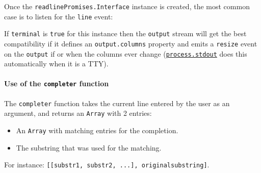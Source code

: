 Once the \texttt{readlinePromises.Interface} instance is created, the
most common case is to listen for the
\texttt{\textquotesingle{}line\textquotesingle{}} event:

\begin{Shaded}
\begin{Highlighting}[]
\NormalTok{(}\OperatorTok{,}\KeywordTok{=\textgreater{}}\NormalTok{ \{}
  \NormalTok{(}\SpecialCharTok{$\{}\SpecialCharTok{\}}\VerbatimStringTok{\textasciigrave{}}\NormalTok{)}\OperatorTok{;}
\NormalTok{\})}\OperatorTok{;}
\end{Highlighting}
\end{Shaded}

If \texttt{terminal} is \texttt{true} for this instance then the
\texttt{output} stream will get the best compatibility if it defines an
\texttt{output.columns} property and emits a
\texttt{\textquotesingle{}resize\textquotesingle{}} event on the
\texttt{output} if or when the columns ever change
(\href{process.md\#processstdout}{\texttt{process.stdout}} does this
automatically when it is a TTY).

\paragraph{\texorpdfstring{Use of the \texttt{completer}
function}{Use of the completer function}}\label{use-of-the-completer-function}

The \texttt{completer} function takes the current line entered by the
user as an argument, and returns an \texttt{Array} with 2 entries:

\begin{itemize}
\tightlist
\item
  An \texttt{Array} with matching entries for the completion.
\item
  The substring that was used for the matching.
\end{itemize}

For instance:
\texttt{{[}{[}substr1,\ substr2,\ ...{]},\ originalsubstring{]}}.

